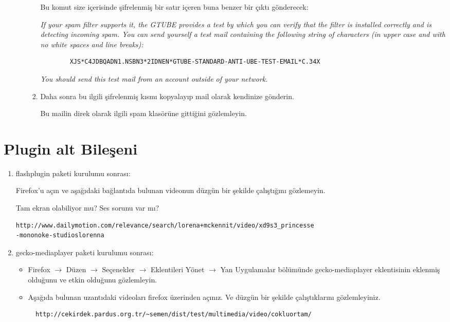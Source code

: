 \documentclass[a4paper,10pt]{article}
\begin{document}
\begin{enumerate}
\begin{enumerate}
\begin{enumerate}
		Bu komut size içerisinde şifrelenmiş bir satır içeren buna benzer bir çıktı gönderecek:
		
		\emph{If your spam filter supports it, the GTUBE provides a test by which you
	    	can verify that the filter is installed correctly and is detecting incoming
    		spam. You can send yourself a test mail containing the following string of
    		characters (in upper case and with no white spaces and line breaks):}
		\begin{verbatim}
 		XJS*C4JDBQADN1.NSBN3*2IDNEN*GTUBE-STANDARD-ANTI-UBE-TEST-EMAIL*C.34X
		\end{verbatim}
    		\emph{You should send this test mail from an account outside of your network.}

		\item Daha sonra bu ilgili şifrelenmiş kısmı kopyalayıp mail olarak kendinize gönderin.
		
		Bu mailin direk olarak ilgili spam klasörüne gittiğini gözlemleyin.
	\end{enumerate} 
\end{enumerate} 
\end{enumerate}
\section{Plugin alt Bileşeni}
\begin{enumerate}
\item flashplugin paketi kurulumu sonrası:

Firefox'u açın ve aşağıdaki bağlantıda bulunan videonun düzgün bir şekilde çalıştığını gözlemeyin.

Tam ekran olabiliyor mu? Ses sorunu var mı?
\begin{verbatim}
http://www.dailymotion.com/relevance/search/lorena+mckennit/video/xd9s3_princesse
-mononoke-studioslorenna 
\end{verbatim}

\item gecko-mediaplayer paketi kurulumu sonrası:
\begin{itemize}
  \item Firefox $\rightarrow$ Düzen $\rightarrow$ Seçenekler $\rightarrow$ Eklentileri Yönet $\rightarrow$ Yan Uygulamalar bölümünde gecko-mediaplayer eklentisinin eklenmiş olduğunu ve etkin olduğunu gözlemleyin.
  \item Aşağıda bulunan uzantıdaki videoları firefox üzerinden açınız. Ve düzgün bir şekilde çalıştıklarını gözlemleyiniz.
  \begin{verbatim}
  http://cekirdek.pardus.org.tr/~semen/dist/test/multimedia/video/cokluortam/  
  \end{verbatim}
\end{itemize}
\end{enumerate}
\end{document}
